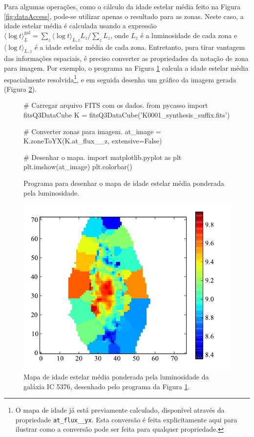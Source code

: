 Para algumas operações, como o cálculo da idade estelar média feito na Figura
\ref{fig:dataAccess}, pode-se utilizar apenas o resultado para as zonas. Neste
caso, a idade estelar média é calculada usando a expressão $\langle \log t
\rangle^{\mathrm{gal}}_L = \sum_z \langle \log t \rangle_{L,z} L_z / \sum_z
L_z$, onde $L_z$ é a luminosidade de cada zona e $\langle \log t \rangle_{L,z}$ é a idade
estelar média de cada zona. Entretanto, para tirar vantagem das informações
espaciais, é preciso converter as propriedades da notação de zona para imagem.
Por exemplo, o programa na Figura \ref{fig:programaMapaIdade} calcula a idade
estelar média espacialmente resolvida\footnote{O mapa de idade já está
previamente calculado, disponível através da propriedade
\texttt{at\_flux\_\_yx}. Esta conversão é feita explicitamente aqui para
ilustrar como a conversão pode ser feita para qualquer propriedade.}, e em
seguida desenha um gráfico da imagem gerada (Figura \ref{fig:mapaIdade}).

\begin{figure}
\begin{python}
# Carregar arquivo FITS com os dados.
from pycasso import fitsQ3DataCube
K = fitsQ3DataCube('K0001_synthesis_suffix.fits')

# Converter zonas para imagem.
at_image = K.zoneToYX(K.at_flux__z, extensive=False)

# Desenhar o mapa.
import matplotlib.pyplot as plt
plt.imshow(at_image)
plt.colorbar()
\end{python}
	\caption[Programa para desenhar o mapa da idade estelar média] {Programa
	para desenhar o mapa de idade estelar média ponderada pela luminosidade.}
	\label{fig:programaMapaIdade}
\end{figure}

\begin{figure}
	\includegraphics{figuras/mapa-idade}
	\caption[Mapa da idade estelar média da galáxia IC 5376] {Mapa de idade estelar
	média ponderada pela luminosidade da galáxia IC 5376, desenhado pelo programa
	da Figura \ref{fig:programaMapaIdade}.}
	\label{fig:mapaIdade}
\end{figure}

